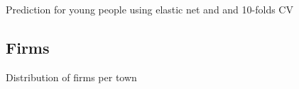 \documentclass[12pt]{beamer}
\begin{document}
	
\begin{frame}{\textcolor{bscuro}{Prediction for young people using elastic net and and 10-folds CV}}
	\begin{figure}[!ht] 
		\centering
	\end{figure}
\end{frame}


\subsection{Firms}


\begin{frame}{\textcolor{bscuro}{Distribution of firms per town}}
	\begin{figure}[!ht] 
		\centering
	\end{figure}
\end{frame}
\end{document}
